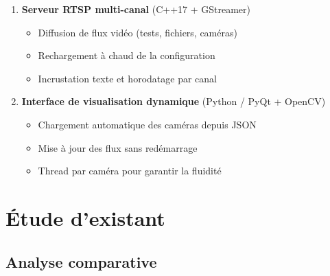 \documentclass[12pt,a4paper]{report}
\newcommand{\important}[1]{\textcolor{primaryBlue}{\textbf{#1}}}
\begin{document}
\begin{enumerate}
    \item \important{Serveur RTSP multi-canal} (C++17 + GStreamer)
    \begin{itemize}
        \item Diffusion de flux vidéo (tests, fichiers, caméras)
        \item Rechargement à chaud de la configuration
        \item Incrustation texte et horodatage par canal
    \end{itemize}
    
    \item \important{Interface de visualisation dynamique} (Python / PyQt + OpenCV)
    \begin{itemize}
        \item Chargement automatique des caméras depuis JSON
        \item Mise à jour des flux sans redémarrage
        \item Thread par caméra pour garantir la fluidité
    \end{itemize}
\end{enumerate}

\chapter{Étude d'existant}

\section{Analyse comparative}
\end{document}
